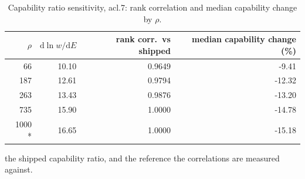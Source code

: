 \begin{table}[htbp]
  \centering
  \caption{Capability ratio sensitivity, acl.7: rank correlation and median capability change by $\rho$.}
  \label{tab:rho-acl-7-summary}
  \begin{tabular}{r r r r}
    \toprule
    $\rho$ & $\mathrm{d}\ln w/\mathrm{d}E$ & rank corr.\ vs shipped & median capability change (\%) \\
    \midrule
    66 & 10.10 & 0.9649 & -9.41 \\
    187 & 12.61 & 0.9794 & -12.32 \\
    263 & 13.43 & 0.9876 & -13.20 \\
    735 & 15.90 & 1.0000 & -14.78 \\
    1000 * & 16.65 & 1.0000 & -15.18 \\
    \bottomrule
  \end{tabular}
  \par\smallskip\footnotesize * the shipped capability ratio, and the reference the correlations are measured against.
\end{table}

